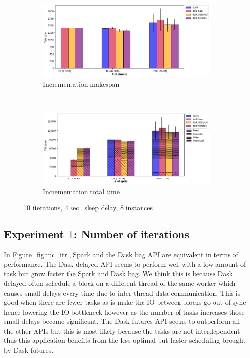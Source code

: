 \documentclass[conference]{IEEEtran}
\begin{document}
\begin{figure}[!t]
    \centering
    \begin{subfigure}[b]{\columnwidth}
        \includegraphics[clip,width=\columnwidth]{images/inc_chunk.png}%
        \caption{Incrementation makespan}\label{fig:inc_ms_chunk}
    \end{subfigure}
    \\
    \begin{subfigure}[b]{\columnwidth}
        \includegraphics[clip,width=\columnwidth]{images/inc_idle_chunk.png}%
        \caption{Incrementation total time}\label{fig:inc_tt_chunk}
    \end{subfigure}
    \caption{10 iterations, 4 sec.\ sleep delay, 8 instances}\label{fig:inc_chunk}
\end{figure}

\subsection{Experiment 1: Number of iterations}
In Figure~\ref{fig:inc_itr}, Spark and the Dask bag API are equivalent in terms of
performance. The Dask delayed API seems to perform well with a low amount of task but
grow faster the Spark and Dask bag. We think this is because Dask delayed often
schedule a block on a different thread of the same worker which causes small delays
every time due to inter-thread data communication. This is good when there are fewer
tasks as is make the IO between blocks go out of sync hence lowering the IO
bottleneck however as the number of tasks increases those small delays become
significant. The Dask futures API seems to outperform all the other APIs but this is
most likely because the tasks are not interdependent thus this application benefits
from the less optimal but faster scheduling brought by Dask futures.
\end{document}
